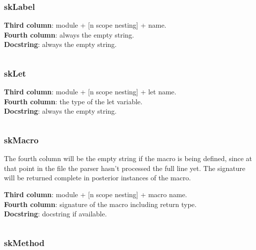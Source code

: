 \hypertarget{sklabel}{%
\subsubsection{skLabel}\label{sklabel}}

\textbf{Third column}: module + {[}n scope nesting{]} + name.\\
\textbf{Fourth column}: always the empty string.\\
\textbf{Docstring}: always the empty string.

\begin{verbatim}
\end{verbatim}

\hypertarget{sklet}{%
\subsubsection{skLet}\label{sklet}}

\textbf{Third column}: module + {[}n scope nesting{]} + let name.\\
\textbf{Fourth column}: the type of the let variable.\\
\textbf{Docstring}: always the empty string.

\begin{verbatim}
\end{verbatim}

\hypertarget{skmacro}{%
\subsubsection{skMacro}\label{skmacro}}

The fourth column will be the empty string if the macro is being
defined, since at that point in the file the parser hasn't processed the
full line yet. The signature will be returned complete in posterior
instances of the macro.

\textbf{Third column}: module + {[}n scope nesting{]} + macro name.\\
\textbf{Fourth column}: signature of the macro including return type.\\
\textbf{Docstring}: docstring if available.

\begin{verbatim}
\end{verbatim}

\hypertarget{skmethod}{%
\subsubsection{skMethod}\label{skmethod}}


